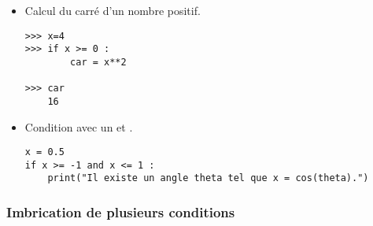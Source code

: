 
\begin{itemize}

\item Calcul du carré d'un nombre positif. 

\begin{lstlisting}
>>> x=4
>>> if x >= 0 : 
        car = x**2

>>> car 
	16
\end{lstlisting}


\item Condition avec un \og et \fg{}. 

\begin{lstlisting}
x = 0.5 
if x >= -1 and x <= 1 :
    print("Il existe un angle theta tel que x = cos(theta).") 

\end{lstlisting}
 \end{itemize}





\subsubsection{Imbrication de plusieurs conditions}

